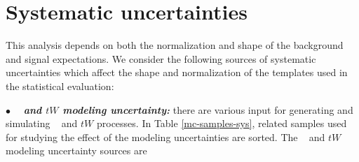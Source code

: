 \clearpage
\section{Systematic uncertainties}
\label{tW_systematic}

This analysis depends on both the normalization and shape of the background and signal expectations.
We consider the following sources of systematic uncertainties which affect the shape and normalization of the templates used in the statistical evaluation:




$\bullet$ \textit{\textbf{\ttbar~ and $tW$ modeling uncertainty:}} there are various input for generating and simulating \ttbar~ and $tW$ processes. In Table \ref{mc-samples-sys}, related samples used for studying the effect of the modeling uncertainties are sorted.
The \ttbar~ and $tW$ modeling uncertainty sources are

